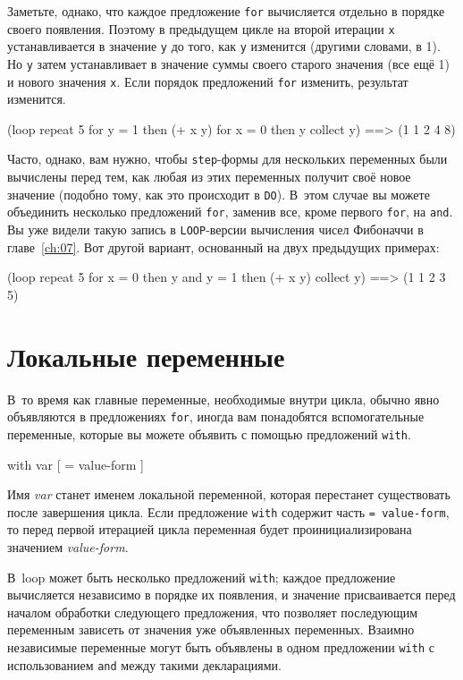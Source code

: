Заметьте, однако, что каждое предложение \lstinline{for} вычисляется отдельно в порядке своего
появления. Поэтому в предыдущем цикле на второй итерации \lstinline{x} устанавливается в
значение \lstinline{y} до того, как \lstinline{y} изменится (другими словами, в 1). Но \lstinline{y}
затем устанавливает в значение суммы своего старого значения (все ещё 1) и нового значения
\lstinline{x}. Если порядок предложений \lstinline{for} изменить, результат изменится.

\begin{myverb}
(loop repeat 5
      for y = 1 then (+ x y)
      for x = 0 then y
      collect y) ==> (1 1 2 4 8)
\end{myverb}

Часто, однако, вам нужно, чтобы \lstinline{step}-формы для нескольких переменных были вычислены перед
тем, как любая из этих переменных получит своё новое значение (подобно тому, как это
происходит в \lstinline{DO}). В~этом случае вы можете объединить несколько предложений
\lstinline{for}, заменив все, кроме первого \lstinline{for}, на \lstinline{and}. Вы уже видели такую запись
в \lstinline{LOOP}-версии вычисления чисел Фибоначчи в главе~\ref{ch:07}. Вот другой вариант,
основанный на двух предыдущих примерах:

\begin{myverb}
(loop repeat 5 
      for x = 0 then y
      and y = 1 then (+ x y)
      collect y) ==> (1 1 2 3 5)
\end{myverb}

\section{Локальные переменные}

В~то время как главные переменные, необходимые внутри цикла, обычно явно объявляются в
предложениях \lstinline{for}, иногда вам понадобятся вспомогательные переменные, которые вы
можете объявить с помощью предложений \lstinline{with}.

\begin{myverb}
with var [ = value-form ]
\end{myverb}

Имя \textit{var} станет именем локальной переменной, которая перестанет существовать после
завершения цикла. Если предложение \lstinline{with} содержит часть \lstinline{= value-form}, то
перед первой итерацией цикла переменная будет проинициализирована значением
\textit{value-form}.

В~loop может быть несколько предложений \lstinline{with}; каждое предложение вычисляется
независимо в порядке их появления, и значение присваивается перед началом обработки
следующего предложения, что позволяет последующим переменным зависеть от значения уже
объявленных переменных. Взаимно независимые переменные могут быть объявлены в одном
предложении \lstinline{with} с использованием \lstinline{and} между такими дек\-ла\-ра\-ция\-ми.

